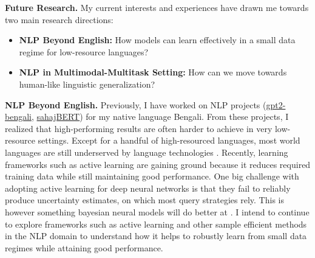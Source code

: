 \documentclass[a4paper]{article}
\begin{document}
\vspace{.2 in}

\noindent \textbf{Future Research.} My current interests and experiences have drawn me towards two main research directions:
\begin{itemize}
\item \textbf{NLP Beyond English:} How models can learn effectively in a small data regime for low-resource languages?
\item \textbf{NLP in Multimodal-Multitask Setting:} How can we move towards human-like linguistic generalization?
\end{itemize}

\vspace{.2 in}

\noindent \textbf{NLP Beyond English.} Previously, I have worked on NLP projects (\href{https://huggingface.co/flax-community/gpt2-bengali}{gpt2-bengali}, \href{https://huggingface.co/neuropark/sahajBERT}{sahajBERT}) for my native language Bengali. From these projects, I realized that high-performing results are often harder to achieve in very low-resource settings. Except for a handful of high-resourced languages, most world languages are still underserved by language technologies \cite{undersevedNLP}. Recently, learning frameworks such as active learning are gaining ground because it reduces required training data while still maintaining good performance. One big challenge with adopting active learning for deep neural networks is that they fail to reliably produce uncertainty estimates, on which most query strategies rely. This is however something bayesian neural models will do better at \cite{bayesianAL, BatchBALD}. I intend to continue to explore frameworks such as active learning and other sample efficient methods in the NLP domain to understand how it helps to robustly learn from small data regimes while attaining good performance.

\vspace{.1 in}
\end{document}
